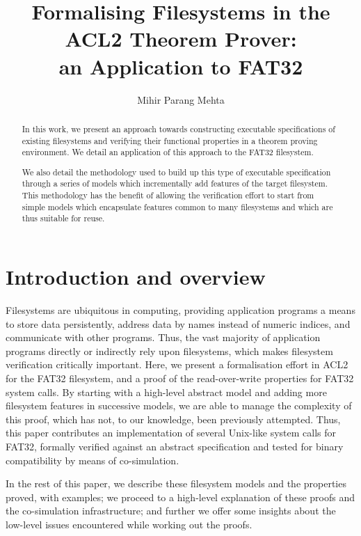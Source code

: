 \documentclass[submission,copyright,creativecommons]{eptcs}
\title{Formalising Filesystems in the ACL2 Theorem Prover:\\ an
  Application to FAT32}
\author{Mihir Parang Mehta
\institute{Department of Computer Science\\
University of Texas at Austin\\
Austin, TX, USA}
\email{mihir@cs.utexas.edu}}
\begin{document}
\maketitle

\begin{abstract}
In this work, we present an
approach towards constructing executable specifications of existing
filesystems and verifying their functional properties in a theorem
proving environment. We detail an application of this approach to the
FAT32 filesystem.

We also detail the methodology used to build up this type of
executable specification through a series of models which
incrementally add features of the target filesystem. This methodology
has the benefit of allowing the verification effort to start from
simple models which encapsulate features common to many filesystems
and which are thus suitable for reuse.
\end{abstract}

\section{Introduction and overview}

Filesystems are ubiquitous in computing, providing application
programs a means to store data persistently, address data by names
instead of numeric indices, and communicate with other programs.
Thus, the vast majority of application programs
directly or indirectly rely upon filesystems, which makes filesystem
verification critically important. Here, we present a
formalisation effort in ACL2 for the FAT32 filesystem, and a proof of
the read-over-write properties for FAT32 system calls. By starting
with a high-level abstract model and adding more filesystem features
in successive models, we are able to manage the complexity of this
proof, which has not, to our knowledge, been previously
attempted. Thus, this paper contributes an implementation of several
Unix-like system calls for FAT32, formally verified against an
abstract specification and tested for binary compatibility by means of
co-simulation.

In the rest of this paper, we describe these filesystem
models and the properties proved, with examples; we proceed to a
high-level explanation of these proofs and the co-simulation
infrastructure; and further we offer some insights about the low-level
issues encountered while working out the proofs.
\end{document}
